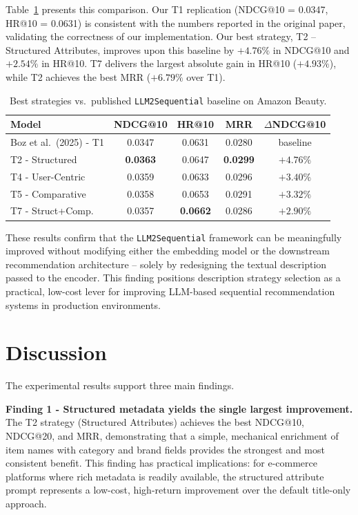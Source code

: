 \documentclass[12pt,a4paper]{report}
\begin{document}
Table~\ref{tab:vs_boz} presents this comparison. Our T1 replication (NDCG@10
= 0.0347, HR@10 = 0.0631) is consistent with the numbers reported in the
original paper, validating the correctness of our implementation. Our best
strategy, T2 -- Structured Attributes, improves upon this baseline by \(+4.76\%\)
in NDCG@10 and \(+2.54\%\) in HR@10. T7 delivers the largest absolute gain in
HR@10 (\(+4.93\%\)), while T2 achieves the best MRR (\(+6.79\%\) over T1).

\begin{table}[h]
\centering
\caption{Best strategies vs.\ published \texttt{LLM2Sequential} baseline on Amazon Beauty.}
\label{tab:vs_boz}
\begin{tabular}{p{3.2cm} c c c c}
\toprule
\textbf{Model} & \textbf{NDCG@10} & \textbf{HR@10} & \textbf{MRR} &
\(\Delta\)\textbf{NDCG@10} \\
\midrule
Boz et al.\ (2025) - T1 & 0.0347 & 0.0631 & 0.0280 & baseline \\
\midrule
T2 - Structured    & \textbf{0.0363} & 0.0647 & \textbf{0.0299} & \(\mathbf{+4.76\%}\) \\
T4 - User-Centric  & 0.0359 & 0.0633 & 0.0296 & \(+3.40\%\) \\
T5 - Comparative   & 0.0358 & 0.0653 & 0.0291 & \(+3.32\%\) \\
T7 - Struct+Comp.  & 0.0357 & \textbf{0.0662} & 0.0286 & \(+2.90\%\) \\
\bottomrule
\end{tabular}
\end{table}

\justifying
These results confirm that the \texttt{LLM2Sequential} framework can be
meaningfully improved without modifying either the embedding model or the
downstream recommendation architecture -- solely by redesigning the textual
description passed to the encoder. This finding positions description strategy
selection as a practical, low-cost lever for improving LLM-based sequential
recommendation systems in production environments.

\section{Discussion}
\label{sec:pc_discussion}

\justifying
The experimental results support three main findings.

\textbf{Finding 1 - Structured metadata yields the single largest improvement.}
The T2 strategy (Structured Attributes) achieves the best NDCG@10, NDCG@20,
and MRR, demonstrating that a simple, mechanical enrichment of item names
with category and brand fields provides the strongest and most consistent
benefit. This finding has practical implications: for e-commerce platforms
where rich metadata is readily available, the structured attribute prompt
represents a low-cost, high-return improvement over the default title-only
approach.
\end{document}
